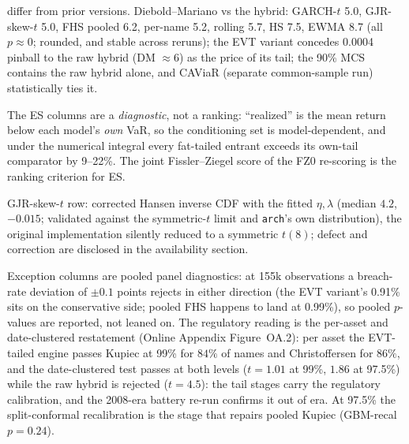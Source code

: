 \documentclass[11pt]{article}
\theoremstyle{remark}
\begin{document}
\begin{table}[t]
\begin{threeparttable}
\begin{tablenotes}
differ from prior versions.
Diebold--Mariano vs the hybrid: GARCH-$t$ 5.0, GJR-skew-$t$ 5.0,
FHS pooled 6.2, per-name 5.2, rolling 5.7, HS 7.5, EWMA 8.7 (all
$p\approx0$; rounded, and stable across reruns); the EVT variant
concedes 0.0004 pinball to the raw hybrid (DM ${\approx}6$) as the
price of its tail; the 90\% MCS contains the
raw hybrid alone, and CAViaR (separate common-sample run)
statistically ties it.
\item The ES columns are a \emph{diagnostic}, not a ranking:
``realized'' is the mean return below each model's \emph{own} VaR, so
the conditioning set is model-dependent, and under the numerical integral
every fat-tailed entrant exceeds its own-tail comparator by 9--22\%.
The joint Fissler--Ziegel score of the FZ0 re-scoring is the ranking
criterion for ES.
\item GJR-skew-$t$ row: corrected Hansen inverse CDF with the fitted
$\eta,\lambda$ (median $4.2$, $-0.015$; validated against the
symmetric-$t$ limit and \texttt{arch}'s own distribution), the original implementation silently reduced to a symmetric $t(8)$; defect
and correction are disclosed in the availability section.
\item Exception columns are pooled panel diagnostics: at 155k
observations a breach-rate deviation of $\pm0.1$ points rejects in
either direction (the EVT variant's 0.91\% sits on the conservative
side; pooled FHS happens to land at 0.99\%), so pooled $p$-values are
reported, not leaned on. The regulatory reading is the per-asset and
date-clustered restatement (Online Appendix Figure~OA.2): per asset the
EVT-tailed engine passes Kupiec at 99\% for $84\%$ of names and
Christoffersen for $86\%$, and the date-clustered test passes at both
levels ($t=1.01$ at 99\%, $1.86$ at 97.5\%) while the raw hybrid is rejected ($t=4.5$): the tail stages carry the regulatory
calibration, and the 2008-era battery re-run confirms it out of era.
At 97.5\% the split-conformal recalibration is the stage that repairs
pooled Kupiec (GBM-recal $p=0.24$).
\end{tablenotes}
\end{threeparttable}
\end{table}
\end{document}
